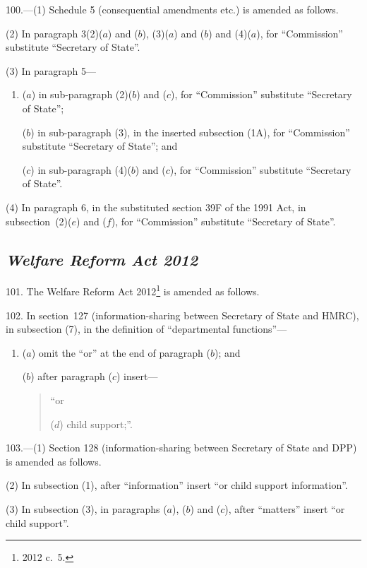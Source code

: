 \documentclass[12pt,a4paper]{article}
\begin{document}
\medskip

100.---(1)  Schedule 5 (consequential amendments etc.) is amended as follows.

(2) In paragraph 3(2)($a$)  and ($b$), (3)($a$)  and ($b$)  and (4)($a$), for “Commission” substitute “Secretary of State”.

(3) In paragraph 5—
\begin{enumerate}\item[]
($a$) in sub-paragraph (2)($b$)  and ($c$), for “Commission” substitute “Secretary of State”;

($b$) in sub-paragraph (3), in the inserted subsection (1A), for “Commission” substitute “Secretary of State”; and

($c$) in sub-paragraph (4)($b$)  and ($c$), for “Commission” substitute “Secretary of State”.
\end{enumerate}

(4) In paragraph 6, in the substituted section 39F of the 1991 Act, in subsection~(2)($e$)  and ($f$), for “Commission” substitute “Secretary of State”.

\subsection*{\itshape Welfare Reform Act 2012}

101.  The Welfare Reform Act 2012\footnote{2012 c.~5.} is amended as follows.

\medskip

102.  In section~127 (information-sharing between Secretary of State and HMRC), in subsection (7), in the definition of “departmental functions”—
\begin{enumerate}\item[]
($a$) omit the “or” at the end of paragraph ($b$); and

($b$) after paragraph ($c$)  insert—
\begin{quotation}
“or

($d$) child support;”.
\end{quotation}
\end{enumerate}

\medskip

103.---(1)  Section 128 (information-sharing between Secretary of State and DPP) is amended as follows.

(2) In subsection (1), after “information” insert “or child support information”.

(3) In subsection (3), in paragraphs ($a$), ($b$)  and ($c$), after “matters” insert “or child support”.
\end{document}
